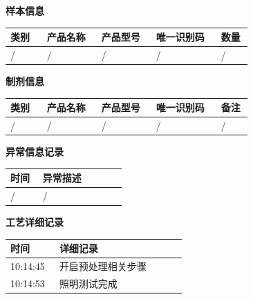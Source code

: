 \documentclass[UTF8,10pt,a4paper,fontset=fandol]{ctexart}
\newcommand{\fieldvalue}[1]{#1}
\begin{document}
\begin{minipage}[t]{0.47\linewidth}
\smallskip
\textbf{样本信息}

\begin{tabular}{|p{0.14\linewidth}|p{0.21\linewidth}|p{0.21\linewidth}|p{0.25\linewidth}|p{0.12\linewidth}|}
\hline
类别&产品名称&产品型号&唯一识别码&数量\\
\hline
\fieldvalue{/}&
\fieldvalue{/}&
\fieldvalue{/}&
\fieldvalue{/}&
\fieldvalue{/}\\
\hline
\end{tabular}

\smallskip
\textbf{制剂信息}

\begin{tabular}{|p{0.14\linewidth}|p{0.21\linewidth}|p{0.21\linewidth}|p{0.25\linewidth}|p{0.12\linewidth}|}
\hline
类别&产品名称&产品型号&唯一识别码&备注\\
\hline
\fieldvalue{/}&
\fieldvalue{/}&
\fieldvalue{/}&
\fieldvalue{/}&
\fieldvalue{/}\\
\hline
\end{tabular}

\smallskip
\textbf{异常信息记录}

\begin{tabular}{|p{0.25\linewidth}|p{0.65\linewidth}|}
\hline
时间&异常描述\\
\hline
\fieldvalue{/}&
\fieldvalue{/}\\
\hline
\end{tabular}

\smallskip
\textbf{工艺详细记录}

\begin{tabular}{|p{0.25\linewidth}|p{0.65\linewidth}|}
\hline
时间&详细记录\\
\hline
10:14:45&开启预处理相关步骤\\
10:14:53&照明测试完成\\
\hline
\end{tabular}
\end{minipage}
\end{document}
